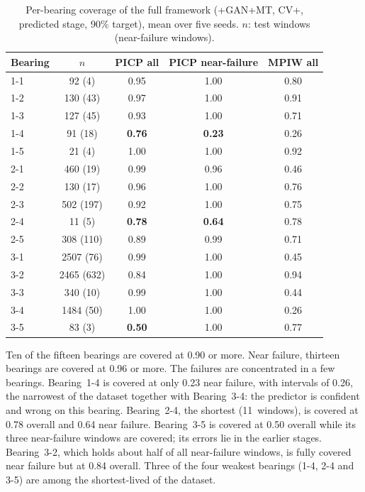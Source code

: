 \begin{table}[htbp]
\centering
\caption{Per-bearing coverage of the full framework (+GAN+MT, CV+,
predicted stage, 90\% target), mean over five seeds. $n$: test windows
(near-failure windows).}
\label{tab:per_bearing}
\footnotesize
\renewcommand{\arraystretch}{1.15}
\begin{tabular}{lcccc}
\toprule
\textbf{Bearing} & \textbf{$n$} & \textbf{PICP all} &
\textbf{PICP near-failure} & \textbf{MPIW all} \\
\midrule
1-1 & 92 (4)      & 0.95 & 1.00 & 0.80 \\
1-2 & 130 (43)    & 0.97 & 1.00 & 0.91 \\
1-3 & 127 (45)    & 0.93 & 1.00 & 0.71 \\
1-4 & 91 (18)     & \textbf{0.76} & \textbf{0.23} & 0.26 \\
1-5 & 21 (4)      & 1.00 & 1.00 & 0.92 \\
2-1 & 460 (19)    & 0.99 & 0.96 & 0.46 \\
2-2 & 130 (17)    & 0.96 & 1.00 & 0.76 \\
2-3 & 502 (197)   & 0.92 & 1.00 & 0.75 \\
2-4 & 11 (5)      & \textbf{0.78} & \textbf{0.64} & 0.78 \\
2-5 & 308 (110)   & 0.89 & 0.99 & 0.71 \\
3-1 & 2507 (76)   & 0.99 & 1.00 & 0.45 \\
3-2 & 2465 (632)  & 0.84 & 1.00 & 0.94 \\
3-3 & 340 (10)    & 0.99 & 1.00 & 0.44 \\
3-4 & 1484 (50)   & 1.00 & 1.00 & 0.26 \\
3-5 & 83 (3)      & \textbf{0.50} & 1.00 & 0.77 \\
\bottomrule
\end{tabular}
\end{table}

Ten of the fifteen bearings are covered at 0.90 or more. Near failure,
thirteen bearings are covered at 0.96 or more. The failures are
concentrated in a few bearings. Bearing~1-4 is covered at only 0.23
near failure, with intervals of 0.26, the narrowest of the dataset
together with Bearing~3-4: the predictor is confident and wrong on
this bearing. Bearing~2-4, the shortest (11~windows), is covered at
0.78 overall and 0.64 near failure. Bearing~3-5 is covered at 0.50
overall while its three near-failure windows are covered; its errors
lie in the earlier stages. Bearing~3-2, which holds about half of all
near-failure windows, is fully covered near failure but at 0.84 overall.
Three of the four weakest bearings (1-4, 2-4 and 3-5) are among the
shortest-lived of the dataset.\\

